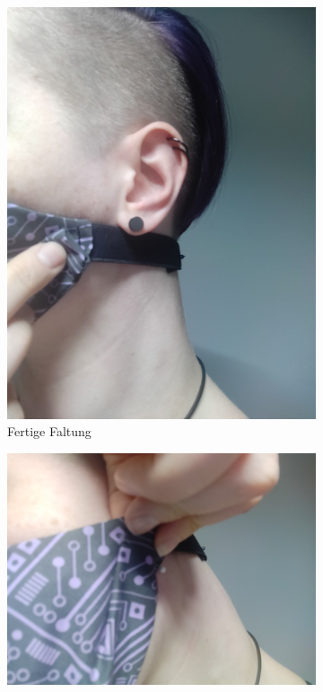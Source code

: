 \documentclass[12pt,parskip=full]{scrartcl}
\begin{document}
\begin{figure}[hp]
\begin{subfigure}{0.48\textwidth}
        \includegraphics[width = \linewidth]{Pictures/11_Folding/Folding3.jpg}
        \caption{Fertige Faltung}
        \label{Folding3}
    \end{subfigure}
    \begin{subfigure}{0.48\textwidth}
        \centering
        \includegraphics[width = \linewidth]{Pictures/11_Folding/Folding4.jpg}

\end{subfigure}
\end{figure}
\end{document}
